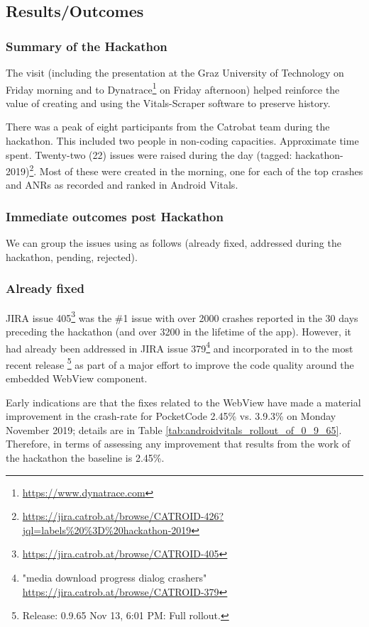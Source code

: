 \subsection{Results/Outcomes}


\subsubsection{Summary of the Hackathon}
The visit (including the presentation at the Graz University of Technology on Friday morning and to Dynatrace\footnote{\url{https://www.dynatrace.com}} on Friday afternoon) helped reinforce the value of creating and using the Vitals-Scraper software to preserve history. 

There was a peak of eight participants from the Catrobat team during the hackathon. This included two people %
in non-coding capacities. Approximate time spent. Twenty-two (22) issues were raised during the day (tagged: hackathon-2019)\footnote{\url{https://jira.catrob.at/browse/CATROID-426?jql=labels\%20\%3D\%20hackathon-2019}}. Most of these were created in the morning, one for each of the top crashes and ANRs as recorded and ranked in Android Vitals. 

\subsubsection{Immediate outcomes post Hackathon}
We can group the issues using as follows (already fixed, addressed during the hackathon, pending, rejected).

\subsubsection{Already fixed} JIRA issue 405\footnote{\url{https://jira.catrob.at/browse/CATROID-405}} was the \#1 issue with over 2000 crashes reported in the 30 days preceding the hackathon (and over 3200 in the lifetime of the app). However, it had already been addressed in JIRA issue 379\footnote{"media download progress dialog crashers" \url{https://jira.catrob.at/browse/CATROID-379}} and incorporated in to the most recent release \footnote{Release:
0.9.65 Nov 13, 6:01 PM: Full rollout.} as part of a major effort to improve the code quality around the embedded WebView component.

Early indications are that the fixes related to the WebView have made a material improvement in the crash-rate for PocketCode 2.45\% vs. 3.9.3\% on Monday  November 2019; details are in Table \ref{tab:androidvitals_rollout_of_0_9_65}. Therefore, in terms of assessing any improvement that results from the work of the hackathon the baseline is 2.45\%.

